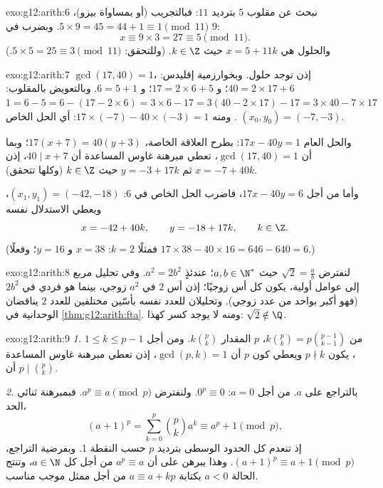 \begin{solution}{exo:g12:arith:6}
نبحث عن مقلوب $5$ بترديد $11$: فبالتجريب (أو بمساواة بيزو)،
$5 \times 9 = 45 = 44 + 1 \equiv 1 \pmod{11}$. وبضرب  في
$9$:
\[
x \equiv 9 \times 3 = 27 \equiv 5 \pmod{11}.
\]
والحلول هي  $x = 5 + 11k$ حيث $k \in \Z$. (وللتحقق:
$5\times5 = 25 \equiv 3 \pmod{11}$.)
\end{solution}

\begin{solution}{exo:g12:arith:7}
$\gcd(17, 40) = 1$، إذن توجد حلول. وبخوارزمية إقليدس:
$40 = 2\times17 + 6$؛ و $17 = 2\times6 + 5$؛ و $6 = 5 + 1$. وبالتعويض بالمقلوب:
$1 = 6 - 5 = 6 - (17 - 2\times6) = 3\times6 - 17
= 3(40 - 2\times17) - 17 = 3\times40 - 7\times17$. ومنه
$17\times(-7) - 40\times(-3) = 1$: أي الحل الخاص
$(x_0, y_0) = (-7, -3)$.

والحل العام  $17x - 40y = 1$: بطرح العلاقة الخاصة،
$17(x + 7) = 40(y + 3)$؛ وبما أن $\gcd(17, 40) = 1$، تعطي مبرهنة غاوس المساعدة
أن $40 \mid x + 7$، إذن $x = -7 + 40k$ ثم $y = -3 + 17k$ حيث $k \in \Z$
(وكلها تتحقق).

وأما من أجل $17x - 40y = 6$، فاضرب الحل الخاص في $6$:
$(x_1, y_1) = (-42, -18)$، ويعطي الاستدلال نفسه
\[
x = -42 + 40k, \qquad y = -18 + 17k, \qquad k \in \Z .
\]
(فمثلًا $k = 2$: $x = 38$ و $y = 16$؛ وفعلًا $17\times38 - 40\times16
= 646 - 640 = 6$.)
\end{solution}

\begin{solution}{exo:g12:arith:8}
لنفترض $\sqrt2 = \frac ab$ حيث $a, b \in \N^*$؛ عندئذٍ $a^2 = 2b^2$. وفي
تحليل مربع إلى عوامل أولية، يكون كل أس زوجيًا؛ إذن أس
$2$ في $a^2$ زوجي، بينما هو فردي في $2b^2$ (فهو أكبر بواحد من عدد
زوجي). وتحليلان للعدد نفسه بأسّين مختلفين للعدد
$2$ يناقضان الوحدانية في \cref{thm:g12:arith:fta}. ومنه لا يوجد
كسر كهذا: $\sqrt2 \notin \Q$.
\end{solution}

\begin{solution}{exo:g12:arith:9}
\emph{1.} من $k\binom pk = p \binom{p-1}{k-1}$،  $p$ المقدار
$k\binom pk$. ومن أجل $1 \leq k \leq p-1$، يكون $p \nmid k$ ويعطي كون $p$ 
أن $\gcd(p, k) = 1$، إذن تعطي مبرهنة غاوس المساعدة أن $p \mid \binom pk$.

\emph{2.} بالتراجع على $a$. من أجل $a = 0$: $0^p \equiv 0$. ولنفترض
$a^p \equiv a \pmod p$. فبمبرهنة ثنائي الحد،
\[
(a+1)^p = \sum_{k=0}^{p} \binom pk a^k
\equiv a^p + 1 \pmod p,
\]
إذ تنعدم كل الحدود الوسطى بترديد $p$ حسب النقطة 1. وبفرضية
التراجع، $(a+1)^p \equiv a + 1 \pmod p$. وهذا يبرهن على أن
$a^p \equiv a$ من أجل كل $a \in \N$، وتنتج الحالة $a < 0$ بكتابة
$a \equiv a + kp$ من أجل ممثل موجب مناسب.
\end{solution}


